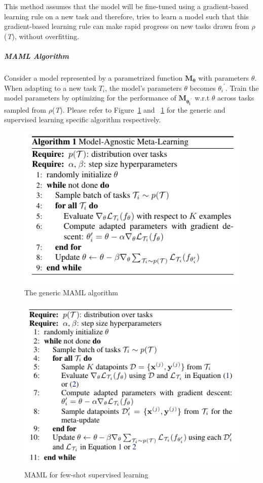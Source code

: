 This method assumes that the model will be fine-tuned using a gradient-based learning rule on a new task and therefore,  tries to learn a model such that this gradient-based learning rule can make rapid progress on new tasks drawn from $\rho$(\textit{T}), without overfitting.
\subparagraph{MAML Algorithm}
Consider a model represented by a parametrized function $\mathbf{M_\theta}$ with parameters $\theta$. When adapting to a new task $\textit{T}_i$, the model's parameters $\theta$ becomes ${\theta_i}^\prime$. Train the model parameters by optimizing for the performance of $\mathbf{M_{{\theta_i}^\prime}}$ w.r.t $\theta$ across tasks sampled from $\rho$(\textit{T}). Please refer to Figure~\ref{fig:MAML} and ~\ref{fig:MAML} for the generic and supervised learning specific algorithm respectively.\\

\begin{figure}
\includegraphics[height=8cm,width=\textwidth,keepaspectratio]{maml_1.png}
\caption{\label{fig:MAML}The generic MAML algorithm}
\end{figure}

\begin{figure}
\includegraphics[height=8.5cm,width=\textwidth,keepaspectratio]{maml_2.png}
\caption{\label{fig:MAML2}MAML for few-shot supervised learning}
\end{figure}

